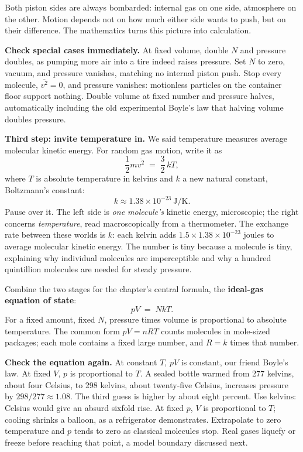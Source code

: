 Both piston sides are always bombarded: internal gas on one side, atmosphere on the other. Motion depends not on how much either side wants to push, but on their difference. The mathematics turns this picture into calculation.

\textbf{Check special cases immediately.} At fixed volume, double \(N\) and pressure doubles, as pumping more air into a tire indeed raises pressure. Set \(N\) to zero, vacuum, and pressure vanishes, matching no internal piston push. Stop every molecule, \(\overline{v^2}=0\), and pressure vanishes: motionless particles on the container floor support nothing. Double volume at fixed number and pressure halves, automatically including the old experimental Boyle's law that halving volume doubles pressure.

\textbf{Third step: invite temperature in.} We said temperature measures average molecular kinetic energy. For random gas motion, write it as
\[
\frac{1}{2} m \overline{v^{2}} \;=\; \frac{3}{2}\, k T,
\]
where \(T\) is absolute temperature in kelvins and \(k\) a new natural constant, Boltzmann's constant:
\[
k \approx 1.38\times 10^{-23}\ \text{J/K}.
\]
Pause over it. The left side is \emph{one molecule's} kinetic energy, microscopic; the right concerns \emph{temperature}, read macroscopically from a thermometer. The exchange rate between these worlds is \(k\): each kelvin adds \(1.5\times 1.38\times 10^{-23}\) joules to average molecular kinetic energy. The number is tiny because a molecule is tiny, explaining why individual molecules are imperceptible and why a hundred quintillion molecules are needed for steady pressure.

Combine the two stages for the chapter's central formula, the \textbf{ideal-gas equation of state}:
\[
pV \;=\; NkT.
\]
For a fixed amount, fixed \(N\), pressure times volume is proportional to absolute temperature. The common form \(pV = nRT\) counts molecules in mole-sized packages; each mole contains a fixed large number, and \(R = k\) times that number.

\textbf{Check the equation again.} At constant \(T\), \(pV\) is constant, our friend Boyle's law. At fixed \(V\), \(p\) is proportional to \(T\). A sealed bottle warmed from 277 kelvins, about four Celsius, to 298 kelvins, about twenty-five Celsius, increases pressure by \(298/277 \approx 1.08\). The third guess is higher by about eight percent. Use kelvins: Celsius would give an absurd sixfold rise. At fixed \(p\), \(V\) is proportional to \(T\); cooling shrinks a balloon, as a refrigerator demonstrates. Extrapolate to zero temperature and \(p\) tends to zero as classical molecules stop. Real gases liquefy or freeze before reaching that point, a model boundary discussed next.

